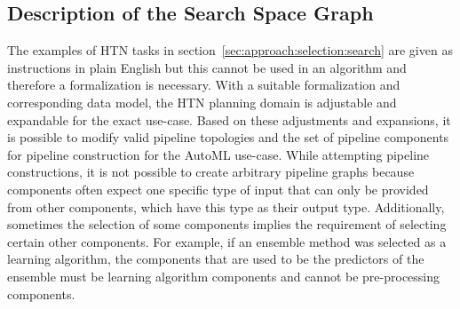 \subsection{Description of the Search Space Graph}
\label{sec:approach:selection:graph}
The examples of HTN tasks in section~\ref{sec:approach:selection:search} are given as instructions in plain English but this cannot be used in an algorithm and therefore a formalization is necessary.
With a suitable formalization and corresponding data model, the HTN planning domain is adjustable and expandable for the exact use-case.
Based on these adjustments and expansions, it is possible to modify valid pipeline topologies and the set of pipeline components for pipeline construction for the AutoML use-case.\newline
While attempting pipeline constructions, it is not possible to create arbitrary pipeline graphs because components often expect one specific type of input that can only be provided from other components, which have this type as their output type.
Additionally, sometimes the selection of some components implies the requirement of selecting certain other components.
For example, if an ensemble method was selected as a learning algorithm, the components that are used to be the predictors of the ensemble must be learning algorithm components and cannot be pre-processing components.

